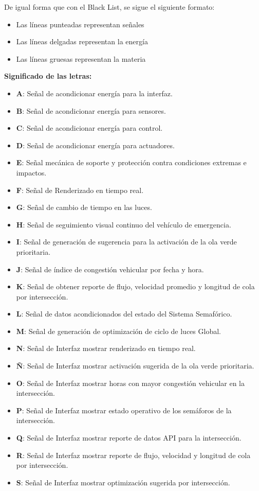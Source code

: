 \documentclass[12pt,a4paper,oneside]{report}
\begin{document}
De igual forma que con el Black List, se sigue el siguiente formato:

\begin{itemize}
\item
  Las líneas punteadas representan señales
\item
  Las líneas delgadas representan la energía
\item
  Las líneas gruesas representan la materia
\end{itemize}

\textbf{Significado de las letras:}

\begin{itemize}
\item
  \textbf{A}: Señal de acondicionar energía para la interfaz.
\item
  \textbf{B}: Señal de acondicionar energía para sensores.
\item
  \textbf{C}: Señal de acondicionar energía para control.
\item
  \textbf{D}: Señal de acondicionar energía para actuadores.
\item
  \textbf{E}: Señal mecánica de soporte y protección contra condiciones extremas e impactos.
\item
  \textbf{F}: Señal de Renderizado en tiempo real.
\item
  \textbf{G}: Señal de cambio de tiempo en las luces.
\item
  \textbf{H}: Señal de seguimiento visual continuo del vehículo de emergencia.
\item
  \textbf{I}: Señal de generación de sugerencia para la activación de la ola verde prioritaria.
\item
  \textbf{J}: Señal de índice de congestión vehicular por fecha y hora.
\item
  \textbf{K}: Señal de obtener reporte de flujo, velocidad promedio y longitud de cola por intersección.
\item
  \textbf{L}: Señal de datos acondicionados del estado del Sistema Semafórico.
\item
  \textbf{M}: Señal de generación de optimización de ciclo de luces Global.
\item
  \textbf{N}: Señal de Interfaz mostrar renderizado en tiempo real.
\item
  \textbf{Ñ}: Señal de Interfaz mostrar activación sugerida de la ola verde prioritaria.
\item
  \textbf{O}: Señal de Interfaz mostrar horas con mayor congestión vehicular en la intersección.
\item
  \textbf{P}: Señal de Interfaz mostrar estado operativo de los semáforos de la intersección.
\item
  \textbf{Q}: Señal de Interfaz mostrar reporte de datos API para la intersección.
\item
  \textbf{R}: Señal de Interfaz mostrar reporte de flujo, velocidad y longitud de cola por intersección.
\item
  \textbf{S}: Señal de Interfaz mostrar optimización sugerida por intersección.
\end{itemize}
\end{document}
